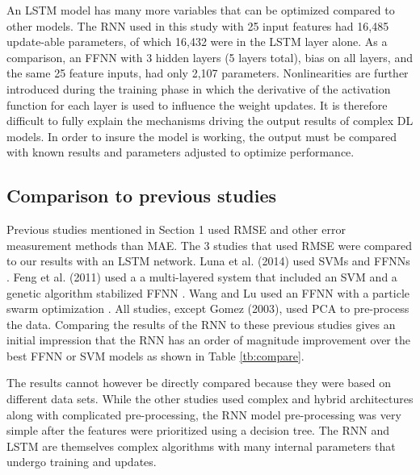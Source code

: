 An LSTM model has many more variables that can be optimized compared to other models. The RNN used in this study with 25 input features had 16,485 update-able parameters, of which 16,432 were in the LSTM layer alone. As a comparison, an FFNN with 3 hidden layers (5 layers total), bias on all layers, and the same 25 feature inputs, had only 2,107 parameters. Nonlinearities are further introduced during the training phase in which the derivative of the activation function for each layer is used to influence the weight updates. It is therefore difficult to fully explain the mechanisms driving the output results of complex DL models. In order to insure the model is working, the output must be compared with known results and parameters adjusted to optimize performance.

\subsection{Comparison to previous studies}
Previous studies mentioned in Section 1 used RMSE and other error measurement methods than MAE. The 3 studies that used RMSE were compared to our results with an LSTM network. Luna et al. (2014) used SVMs and FFNNs \citep{Luna2014}. Feng et al. (2011) used a a multi-layered system that included an SVM and a genetic algorithm stabilized FFNN \citep{Feng2011}. Wang and Lu used an FFNN with a particle swarm optimization \citep{Wang2006}. All studies, except Gomez (2003), used PCA to pre-process the data. Comparing the results of the RNN to these previous studies gives an initial impression  that the RNN has an order of magnitude improvement over the best FFNN or SVM models as shown in Table \ref{tb:compare}.
%

\begin{table}[H]
\centering
\caption{Comparison of LSTM RNN test data results to previously published results.}
\label{tb:compare}
\end{table}
%
The results cannot however be directly compared because they were based on different data sets. While the other studies used complex and hybrid architectures along with complicated pre-processing, the RNN model pre-processing was very simple after the features were prioritized using a decision tree. The RNN and LSTM are themselves complex algorithms with many internal parameters that undergo training and updates.

